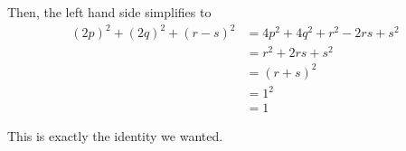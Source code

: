 \documentclass[12pt]{article}
\begin{document}
Then, the left hand side simplifies to
\begin{align*}
    (2p)^2 + (2q)^2 + (r - s)^2 & = 4p^2 + 4q^2 + r^2 - 2rs + s^2 \\
                                & = r^2 +2rs + s^2                \\
                                & = (r+s)^2                       \\
                                & = 1^2                           \\
                                & = 1
\end{align*}

This is exactly the identity we wanted.
\end{document}
